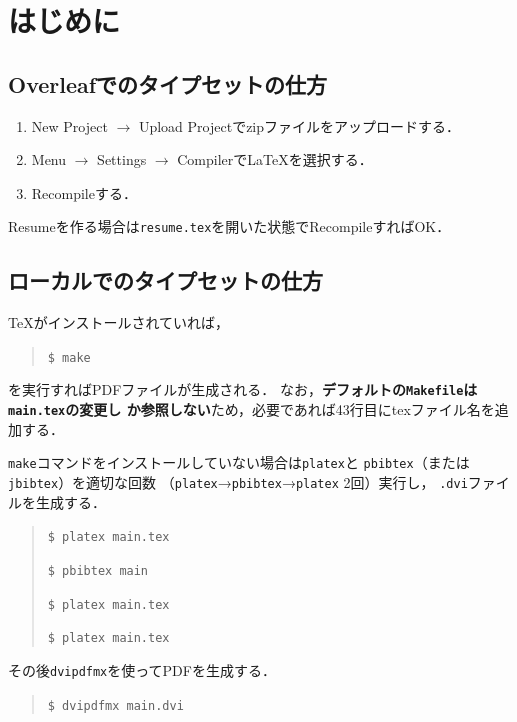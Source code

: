 
\chapter{はじめに}
\label{cha:intro}

\section{Overleafでのタイプセットの仕方}

\begin{enumerate}
 \item New Project $\rightarrow$ Upload Projectでzipファイルをアップロードする．
 \item Menu $\rightarrow$ Settings $\rightarrow$ CompilerでLaTeXを選択する．
 \item Recompileする．
\end{enumerate}

Resumeを作る場合は\texttt{resume.tex}を開いた状態でRecompileすればOK．

\section{ローカルでのタイプセットの仕方}

TeXがインストールされていれば，
\begin{quote}
 \texttt{\$ make}
\end{quote}
を実行すればPDFファイルが生成される．
なお，\textbf{デフォルトの\texttt{Makefile}は\texttt{main.tex}の変更し
か参照しない}ため，必要であれば43行目にtexファイル名を追加する．

\texttt{make}コマンドをインストールしていない場合は\texttt{platex}と
\texttt{pbibtex}（または\texttt{jbibtex}）を適切な回数
（\texttt{platex}→\texttt{pbibtex}→\texttt{platex} 2回）実行し，
\texttt{.dvi}ファイルを生成する．
\begin{quote}
 \texttt{\$ platex main.tex}

 \texttt{\$ pbibtex main}

 \texttt{\$ platex main.tex}

 \texttt{\$ platex main.tex}
\end{quote}

その後\texttt{dvipdfmx}を使ってPDFを生成する．
\begin{quote}
 \texttt{\$ dvipdfmx main.dvi}
\end{quote}

